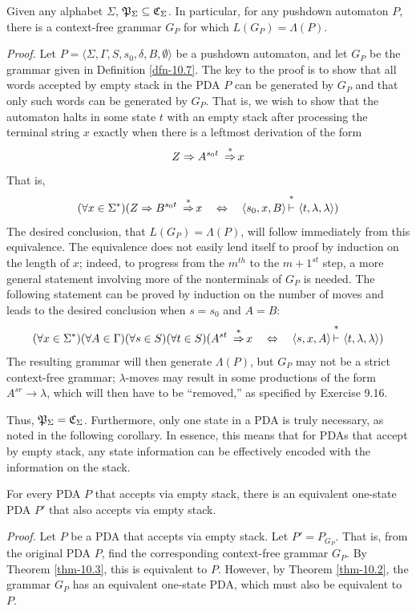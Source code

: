 \begin{thm}\label{thm-10.3}
Given any alphabet $\Sigma$, $\mathfrak{P}_\Sigma\subseteq\mathfrak{C}_\Sigma$. In particular, for any
pushdown automaton $P$, there is a context-free grammar $G_P$ for which $L(G_P)
= \Lambda(P)$.

\emph{Proof.} Let $P=\langle\Sigma,\Gamma,S,s_0,\delta,B,\emptyset\rangle$ be a
pushdown automaton, and let $G_P$ be the grammar given in Definition \ref{dfn-10.7}. The
key to the proof is to show that all words accepted by empty stack in the PDA
$P$ can be generated by $G_P$ and that only such words can be generated by $G_P$.
That is, we wish to show that the automaton halts in some state $t$ with an
empty stack after processing the terminal string $x$ exactly when there is a
leftmost derivation of the form
\[ Z \Rightarrow A^{s_0t}\  \operatorname{\overset{*}{\Rightarrow}} x \]
That is,
\[ (\forall x\in\Sigma^*)(Z\Rightarrow B^{s_0t}\ \DRightarrow x  \ \ \  \Leftrightarrow\ \ \  
	\langle s_0,x, B\rangle \Dvdash \langle t,\lambda,\lambda\rangle) \]
The desired conclusion, that $L(G_P) = \Lambda(P)$, will follow immediately from
this equivalence. The equivalence does not easily lend itself to proof by
induction on the length of $x$; indeed, to progress from the $m^{th}$ to the
$m+1^{st}$ step, a more general statement involving more of the nonterminals of
$G_P$ is needed. The following statement can be proved by induction on the
number of moves and leads to the desired conclusion when $s=s_0$ and $A=B$:
\[ (\forall x\in\Sigma^*)(\forall A\in\Gamma)(\forall s\in S)(\forall t\in S)
	(A^{st}\ \DRightarrow x \ \ \  \Leftrightarrow\ \ \  \langle s,x,A\rangle \Dvdash
	\langle t,\lambda,\lambda\rangle) \]
The resulting grammar will then generate $\Lambda(P)$, but $G_P$ may not be a
strict context-free grammar; $\lambda$-moves may result in some productions of
the form $A^{sr}\rightarrow\lambda$, which will then have to be ``removed,'' as
specified by Exercise 9.16.
\end{thm}

Thus, $\mathfrak{P}_\Sigma=\mathfrak{C}_\Sigma$. Furthermore, only one state in a PDA is truly necessary, as
noted in the following corollary. In essence, this means that for PDAs that
accept by empty stack, any state information can be effectively encoded with the
information on the stack.

\begin{cor}\label{cor-10.1}
For every PDA $P$ that accepts via empty stack, there is an equivalent one-state
PDA $P'$ that also accepts via empty stack.

\emph{Proof.} Let $P$ be a PDA that accepts via empty stack. Let $P'=P_{G_P}$.
That is, from the original PDA $P$, find the corresponding context-free grammar
$G_P$. By Theorem \ref{thm-10.3}, this is equivalent to $P$. However, by Theorem \ref{thm-10.2}, the
grammar $G_P$ has an equivalent one-state PDA, which must also be equivalent to
$P$.
\end{cor}

